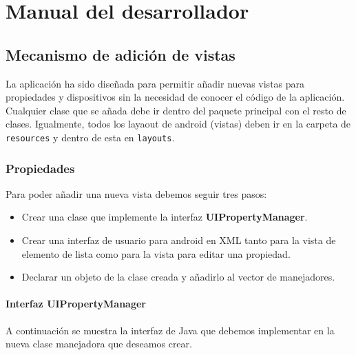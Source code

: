 \chapter{Manual del desarrollador}

\section{Mecanismo de adición de vistas}

La aplicación ha sido diseñada para permitir añadir nuevas vistas para propiedades y dispositivos sin la necesidad de conocer el código de la aplicación. Cualquier clase que se añada debe ir dentro del paquete principal con el resto de clases. Igualmente, todos los layaout de android (vistas) deben ir en la carpeta de \texttt{resources} y dentro de esta en \texttt{layouts}.

\bigskip
\subsection{Propiedades}
Para poder añadir una nueva vista debemos seguir tres pasos:

\begin{itemize}
  \item Crear una clase que implemente la interfaz \textbf{UIPropertyManager}.
  \item Crear una interfaz de usuario para android en XML tanto para la vista de elemento de lista como para la vista para editar una propiedad.
  \item Declarar un objeto de la clase creada y añadirlo al vector de manejadores.
\end{itemize}


\subsubsection{Interfaz UIPropertyManager}

A continuación se muestra la interfaz de Java que debemos implementar en la nueva clase manejadora que deseamos crear.

